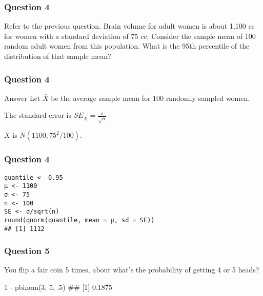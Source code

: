 \begin{frame}[fragile]
\frametitle{Question 4}
Refer to the previous question. Brain volume for adult women is about 1,100 cc for women with a standard deviation of 75 cc. Consider the sample mean of 100 random adult women from this population. What is the 95th percentile of the distribution of that sample mean?

\end{frame}
\begin{frame}[fragile]
\frametitle{Question 4}
Answer
Let \(\bar X\) be the average sample mean for 100 randomly sampled women.

The standard error is \(SE_{\bar X} = \frac{σ}{\sqrt{n}}\)

\(X\) is \(N(1100, 75^2 / 100)\).

\end{frame}
\begin{frame}[fragile]
\frametitle{Question 4}

\begin{framed}
\begin{verbatim}
quantile <- 0.95
μ <- 1100
σ <- 75
n <- 100
SE <- σ/sqrt(n)
round(qnorm(quantile, mean = μ, sd = SE))
## [1] 1112
\end{verbatim}
\end{framed}

\end{frame}
\begin{frame}[fragile]
\frametitle{Question 5}
You flip a fair coin 5 times, about what’s the probability of getting 4 or 5 heads?

1 - pbinom(3, 5, .5)
## [1] 0.1875

\end{frame}
